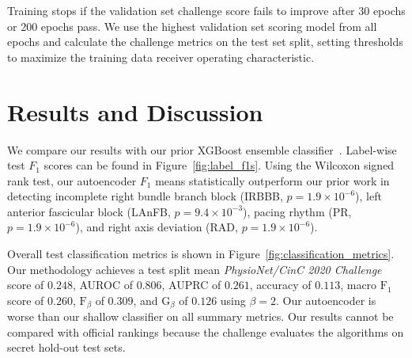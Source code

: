 \documentclass[\main/thesis.tex]{subfiles}
\begin{document}
Training stops if the validation set challenge score fails to improve after 30 epochs or 200 epochs pass.
We use the highest validation set scoring model from all epochs and calculate the challenge metrics on the test set split, setting thresholds to maximize the training data receiver operating characteristic.

\section{Results and Discussion}
\label{sec:aenc_results}

We compare our results with our prior XGBoost ensemble classifier~\cite{wong2020CINC-multilabel-ECG}.
Label-wise test $F_1$ scores can be found in Figure~\ref{fig:label_f1s}.
Using the Wilcoxon signed rank test, our autoencoder $F_1$ means statistically outperform our prior work in detecting incomplete right bundle branch block (IRBBB, $p=1.9\times10^{-6}$), left anterior fascicular block (LAnFB, $p=9.4\times10^{-3}$), pacing rhythm (PR, $p=1.9\times10^{-6}$), and right axis deviation (RAD, $p=1.9\times10^{-6}$).

Overall test classification metrics is shown in Figure~\ref{fig:classification_metrics}.
Our methodology achieves a test split mean \emph{PhysioNet/CinC 2020 Challenge} score of $0.248$, AUROC of $0.806$, AUPRC of $0.261$, accuracy of $0.113$, macro $\text{F}_1$ score of $0.260$, $\text{F}_\beta$ of $0.309$, and $\text{G}_\beta$ of $0.126$ using $\beta = 2$.
Our autoencoder is worse than our shallow classifier on all summary metrics.
Our results cannot be compared with official rankings because the challenge evaluates the algorithms on secret hold-out test sets.
\end{document}
